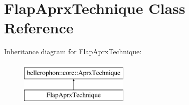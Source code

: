 \hypertarget{classFlapAprxTechnique}{}\section{Flap\+Aprx\+Technique Class Reference}
\label{classFlapAprxTechnique}
Inheritance diagram for Flap\+Aprx\+Technique\+:\begin{figure}[H]
\begin{center}
\leavevmode
\includegraphics[height=2.000000cm]{classFlapAprxTechnique}
\end{center}
\end{figure}
